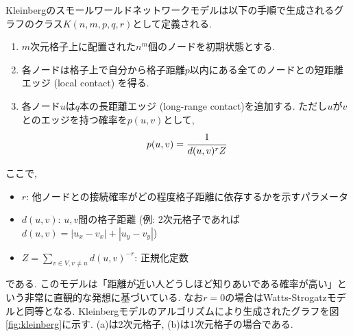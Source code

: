 \documentclass[dvipdfmx]{ampbt}
\begin{document}
   Kleinbergのスモールワールドネットワークモデルは以下の手順で生成されるグラフのクラス$K(n,m,p,q,r)$として定義される.
   \begin{enumerate}
    \item $m$次元格子上に配置された$n^m$個のノードを初期状態とする.
    \item 各ノードは格子上で自分から格子距離$p$以内にある全てのノードとの短距離エッジ (local contact) を得る.
    \item 各ノード$u$は$q$本の長距離エッジ (long-range contact)を追加する. ただし$u$が$v$とのエッジを持つ確率を$p(u,v)$として,
	  \begin{eqnarray}
	   p(u,v)=\cfrac{1}{d(u,v)^{r}Z} \label{eq:kleinberg_p}
	  \end{eqnarray}
   \end{enumerate}
   ここで, 
   \begin{itemize}
    \item  $r$: 他ノードとの接続確率がどの程度格子距離に依存するかを示すパラメータ
    \item  $d(u,v)$: $u,v$間の格子距離 (例: 2次元格子であれば$d(u,v)=|u_x - v_x| + |u_y - v_y|$)
    \item $Z = \displaystyle \sum_{v\in V, v\neq u}^{}d(u,v)^{-r}$: 正規化定数
   \end{itemize}
   である. このモデルは「距離が近い人どうしほど知りあいである確率が高い」という非常に直観的な発想に基づいている. なお$r=0$の場合はWatts-Strogatzモデルと同等となる. Kleinbergモデルのアルゴリズムにより生成されたグラフを図\ref{fig:kleinberg}に示す. (a)は2次元格子, (b)は1次元格子の場合である.
\end{document}
